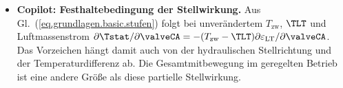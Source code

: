 \begin{itemize}
  \item \textbf{Copilot: Festhaltebedingung der Stellwirkung.}
    Aus Gl.~(\ref{eq.grundlagen.basic.stufen}) folgt bei unverändertem
    $T_{\mathrm{zw}}$, $\TLT$ und Luftmassenstrom
    $\partial\Tstat/\partial\valveCA
      =-(T_{\mathrm{zw}}-\TLT)
         \partial\varepsilon_{\mathrm{LT}}/\partial\valveCA$.
    Das Vorzeichen hängt damit auch von der hydraulischen Stellrichtung
    und der Temperaturdifferenz ab. Die Gesamtmitbewegung im geregelten
    Betrieb ist eine andere Größe als diese partielle Stellwirkung.
\end{itemize}

